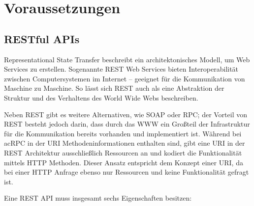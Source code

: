\chapter{Voraussetzungen}

	
	\section{RESTful APIs} %
	
		Representational State Transfer beschreibt ein architektonisches Modell, um Web Services zu erstellen. Sogenannte \ac{REST} Web Services bieten Interoperabilität zwischen Computersystemen im Internet -- geeignet für die Kommunikation von Maschine zu Maschine. So lässt sich REST auch als eine Abstraktion der Struktur und des Verhaltens des World Wide Webs beschreiben. 
		
		Neben REST gibt es weitere Alternativen, wie \ac{SOAP} oder \ac{RPC}; der Vorteil von REST besteht jedoch darin, dass durch das \ac{WWW} ein Großteil der Infrastruktur für die Kommunikation bereits vorhanden und implementiert ist. Während bei \\ac{RPC} in der \ac{URI} Methodeninformationen enthalten sind, gibt eine \ac{URI} in der \ac{REST} Architektur ausschließlich Ressourcen an und kodiert die Funktionalität mittels \ac{HTTP} Methoden. Dieser Ansatz entspricht dem Konzept einer \ac{URI}, da bei einer \ac{HTTP} Anfrage ebenso nur Ressourcen und keine Funktionalität gefragt ist.
		
		Eine REST API muss insgesamt sechs Eigenschaften besitzen:
		
